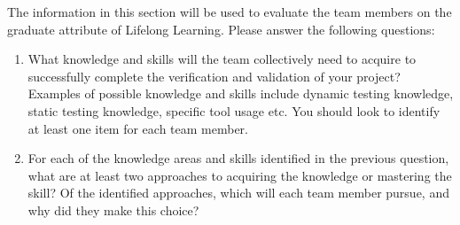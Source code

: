 \documentclass[12pt, titlepage]{article}
\begin{document}

The information in this section will be used to evaluate the team members on the
graduate attribute of Lifelong Learning.  Please answer the following questions:

\begin{enumerate}
  \item What knowledge and skills will the team collectively need to acquire to
  successfully complete the verification and validation of your project?
  Examples of possible knowledge and skills include dynamic testing knowledge,
  static testing knowledge, specific tool usage etc.  You should look to
  identify at least one item for each team member.
  \item For each of the knowledge areas and skills identified in the previous
  question, what are at least two approaches to acquiring the knowledge or
  mastering the skill?  Of the identified approaches, which will each team
  member pursue, and why did they make this choice?
\end{enumerate}
\end{document}
